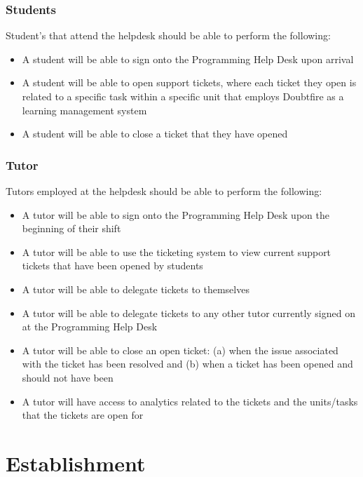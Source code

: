 \documentclass[a4paper,12pt]{article}
\providecommand{\tightlist}{%
  \setlength{\itemsep}{0pt}\setlength{\parskip}{0pt}}
\begin{document}
\subsubsection{Students}\label{students}

Student's that attend the helpdesk should be able to perform the
following:

\begin{itemize}
\tightlist
\item
  A student will be able to sign onto the Programming Help Desk upon
  arrival
\item
  A student will be able to open support tickets, where each ticket they
  open is related to a specific task within a specific unit that employs
  Doubtfire as a learning management system
\item
  A student will be able to close a ticket that they have opened
\end{itemize}

\subsubsection{Tutor}\label{tutor}

Tutors employed at the helpdesk should be able to perform the following:

\begin{itemize}
\tightlist
\item
  A tutor will be able to sign onto the Programming Help Desk upon the
  beginning of their shift
\item
  A tutor will be able to use the ticketing system to view current
  support tickets that have been opened by students
\item
  A tutor will be able to delegate tickets to themselves
\item
  A tutor will be able to delegate tickets to any other tutor currently
  signed on at the Programming Help Desk
\item
  A tutor will be able to close an open ticket: (a) when the issue
  associated with the ticket has been resolved and (b) when a ticket has
  been opened and should not have been
\item
  A tutor will have access to analytics related to the tickets and the
  units/tasks that the tickets are open for
\end{itemize}

\section{Establishment}\label{establishment}
\end{document}
